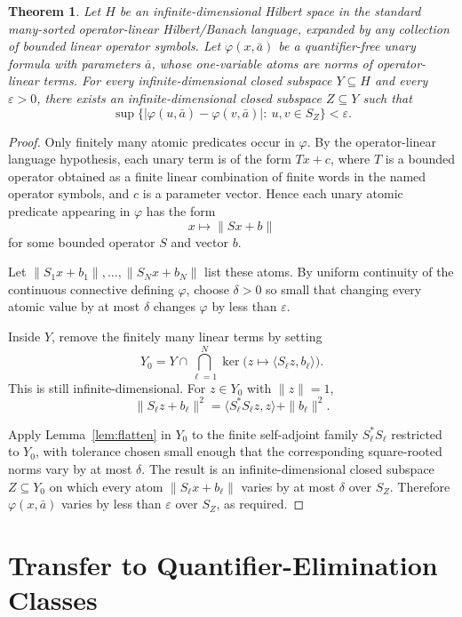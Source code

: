 \documentclass[11pt]{article}
\newtheorem{theorem}{Theorem}
\newcommand{\eps}{\varepsilon}
\begin{document}
\begin{theorem}\label{thm:qf}
Let \(H\) be an infinite-dimensional Hilbert space in the standard many-sorted
operator-linear Hilbert/Banach language, expanded by any collection of bounded
linear operator symbols.  Let \(\varphi(x,\bar a)\) be a quantifier-free unary
formula with parameters \(\bar a\), whose one-variable atoms are norms of
operator-linear terms.  For every infinite-dimensional closed subspace
\(Y\subseteq H\) and every \(\eps>0\), there exists an infinite-dimensional
closed subspace \(Z\subseteq Y\) such that
\[
  \sup\{|\varphi(u,\bar a)-\varphi(v,\bar a)|:\ u,v\in S_Z\}<\eps .
\]
\end{theorem}

\begin{proof}
Only finitely many atomic predicates occur in \(\varphi\).  By the
operator-linear language hypothesis, each unary term is of the form \(T x+c\),
where \(T\) is a bounded operator obtained as a finite linear combination of
finite words in the named operator symbols, and \(c\) is a parameter vector.
Hence each unary atomic predicate appearing in \(\varphi\) has the form
\[
  x\longmapsto \|Sx+b\|
\]
for some bounded operator \(S\) and vector \(b\).

Let \(\|S_1x+b_1\|,\ldots,\|S_Nx+b_N\|\) list these atoms.  By uniform
continuity of the continuous connective defining \(\varphi\), choose
\(\delta>0\) so small that changing every atomic value by at most \(\delta\)
changes \(\varphi\) by less than \(\eps\).

Inside \(Y\), remove the finitely many linear terms by setting
\[
  Y_0
  =
  Y\cap \bigcap_{\ell=1}^N
  \ker\bigl(z\mapsto \langle S_\ell z,b_\ell\rangle\bigr).
\]
This is still infinite-dimensional.  For \(z\in Y_0\) with \(\|z\|=1\),
\[
  \|S_\ell z+b_\ell\|^2
  =
  \langle S_\ell^*S_\ell z,z\rangle+\|b_\ell\|^2 .
\]

Apply Lemma~\ref{lem:flatten} in \(Y_0\) to the finite self-adjoint family
\(S_\ell^*S_\ell\) restricted to \(Y_0\), with tolerance chosen small enough
that the corresponding square-rooted norms vary by at most \(\delta\).  The
result is an infinite-dimensional closed subspace \(Z\subseteq Y_0\) on which
every atom \(\|S_\ell x+b_\ell\|\) varies by at most \(\delta\) over \(S_Z\).
Therefore \(\varphi(x,\bar a)\) varies by less than \(\eps\) over \(S_Z\), as
required.
\end{proof}

\section*{Transfer to Quantifier-Elimination Classes}
\end{document}
